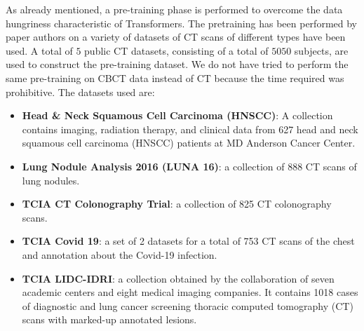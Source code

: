 As already mentioned, a pre-training phase is performed to overcome the data
hungriness characteristic of Transformers. The pretraining has been performed by
paper authors on a variety of datasets of CT scans of different types have been
used. A total of $5$ public CT datasets, consisting of a total of $5050$
subjects, are used to construct the pre-training dataset. We do not have tried
to perform the same pre-training on CBCT data instead of CT because the time
required was prohibitive.
The datasets used are:
\begin{itemize}
  \item{\textbf{Head \& Neck Squamous Cell Carcinoma (HNSCC)}: A collection
    contains imaging, radiation therapy, and clinical data from 627 head and
    neck squamous cell carcinoma (HNSCC) patients at MD Anderson Cancer Center.
    \cite{grossberg2018imaging}}
  \item{\textbf{Lung Nodule Analysis 2016 (LUNA 16)}: a collection of 888 CT
    scans of lung nodules. \cite{setio2017validation}}
  \item{\textbf{TCIA CT Colonography Trial}: a collection of 825 CT colonography
    scans. \cite{johnson2008accuracy}}
  \item{\textbf{TCIA Covid 19}: a set of 2 datasets for a total of 753 CT scans
    of the chest and annotation about the Covid-19 infection.
    \cite{desai2020chest}}
  \item{\textbf{TCIA LIDC-IDRI}: a collection obtained by the collaboration of
    seven academic centers and eight medical imaging companies. It contains 1018
    cases of diagnostic and lung cancer screening thoracic computed tomography
    (CT) scans with marked-up annotated lesions. \cite{armato2011lung}}
\end{itemize}

